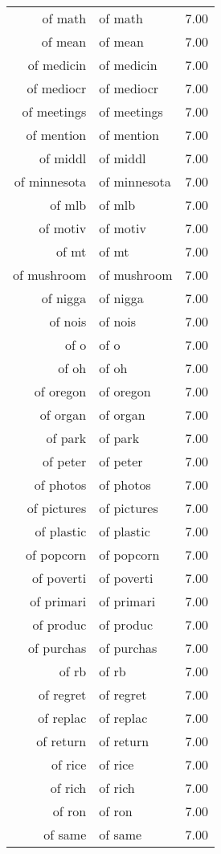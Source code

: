 \begin{table}[ht]
\begin{tabular}{rlr}
  of math & of math & 7.00 \\ 
  of mean & of mean & 7.00 \\ 
  of medicin & of medicin & 7.00 \\ 
  of mediocr & of mediocr & 7.00 \\ 
  of meetings & of meetings & 7.00 \\ 
  of mention & of mention & 7.00 \\ 
  of middl & of middl & 7.00 \\ 
  of minnesota & of minnesota & 7.00 \\ 
  of mlb & of mlb & 7.00 \\ 
  of motiv & of motiv & 7.00 \\ 
  of mt & of mt & 7.00 \\ 
  of mushroom & of mushroom & 7.00 \\ 
  of nigga & of nigga & 7.00 \\ 
  of nois & of nois & 7.00 \\ 
  of o & of o & 7.00 \\ 
  of oh & of oh & 7.00 \\ 
  of oregon & of oregon & 7.00 \\ 
  of organ & of organ & 7.00 \\ 
  of park & of park & 7.00 \\ 
  of peter & of peter & 7.00 \\ 
  of photos & of photos & 7.00 \\ 
  of pictures & of pictures & 7.00 \\ 
  of plastic & of plastic & 7.00 \\ 
  of popcorn & of popcorn & 7.00 \\ 
  of poverti & of poverti & 7.00 \\ 
  of primari & of primari & 7.00 \\ 
  of produc & of produc & 7.00 \\ 
  of purchas & of purchas & 7.00 \\ 
  of rb & of rb & 7.00 \\ 
  of regret & of regret & 7.00 \\ 
  of replac & of replac & 7.00 \\ 
  of return & of return & 7.00 \\ 
  of rice & of rice & 7.00 \\ 
  of rich & of rich & 7.00 \\ 
  of ron & of ron & 7.00 \\ 
  of same & of same & 7.00 \\ 

\end{tabular}
\end{table}
